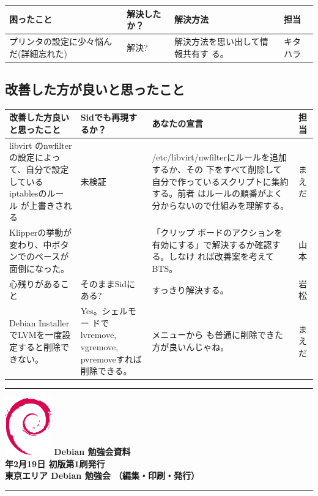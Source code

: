 \documentclass[mingoth,a4paper]{jsarticle}
\newcommand{\debmtgyear}{2011}
\newcommand{\debmtgmonth}{2}
\newcommand{\debmtgdate}{19}
\begin{document}
\begin{table}[ht]
 \begin{center}
  \begin{tabular}{|p{15em}|p{10em}|p{15em}|p{5em}|}
   \hline
   困ったこと & 解決したか？ & 解決方法 & 担当 \\
   \hline
   プリンタの設定に少々悩んだ(詳細忘れた)& 解決? & 解決方法を思い出して情報共有す
	   る。 & キタハラ\\
   \hline
  \end{tabular}
 \end{center}
\end{table}

\subsection{改善した方が良いと思ったこと}

\begin{table}[ht]
 \begin{center}
  \begin{tabular}{|p{15em}|p{10em}|p{15em}|p{3em}|}
   \hline
   改善した方良いと思ったこと & Sidでも再現するか？ & あなたの宣言 & 担
   当 \\
   \hline
   libvirt のnwfilterの設定によって、自分で設定しているiptablesのルール
   が上書きされる & 未検証 & /etc/libvirt/nwfilterにルールを追加するか、その
	   下をすべて削除して自分で作っているスクリプトに集約する。前者
	   はルールの順番がよく分からないので仕組みを理解する。 & まえだ\\
   \hline
   Klipperの挙動が変わり、中ボタンでのペースが面倒になった。& & 「クリップ
	   ボードのアクションを有効にする」で解決するか確認する。しなけ
	   れば改善案を考えてBTS。 & 山本\\
   \hline
   心残りがあること & そのままSidにある? & すっきり解決する。 & 岩松 \\
   \hline
   Debian InstallerでLVMを一度設定すると削除できない。& Yes。シェルモー
       ドでlvremove, vgremove, pvremoveすれば削除できる。 & メニューから
	   も普通に削除できた方が良いんじゃね。 & まえだ \\
   \hline
  \end{tabular}
 \end{center}
\end{table}

\printindex

\cleartooddpage

\vspace*{15cm}
\hrule
\vspace{2mm}
\includegraphics[width=2cm]{image200502/openlogo-nd.eps}
\noindent \Large \bf Debian 勉強会資料\\
\noindent \normalfont \debmtgyear{}年\debmtgmonth{}月\debmtgdate{}日 \hspace{5mm}  初版第1刷発行\\
\noindent \normalfont 東京エリア Debian 勉強会 （編集・印刷・発行）\\
\hrule
\end{document}
